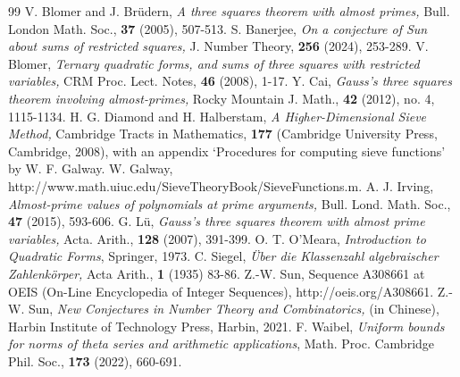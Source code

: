 \documentclass[10pt,a4paper]{amsart}
\numberwithin{equation}{section}
\begin{document}
\begin{thebibliography}{99}
 V. Blomer and J. Br\"udern, {\it A three squares theorem with almost primes,} Bull. London Math. Soc., {\bf37} (2005), 507-513.
 S. Banerjee, {\it On a conjecture of Sun about sums of restricted squares,} J. Number Theory, {\bf256} (2024), 253-289.
 V. Blomer, {\it Ternary quadratic forms, and sums of three squares with restricted variables,} CRM Proc. Lect. Notes, {\bf46} (2008), 1-17.
 Y. Cai, {\it Gauss's three squares theorem involving almost-primes,} Rocky Mountain J. Math., {\bf 42} (2012), no. 4, 1115-1134.
 H. G. Diamond and H. Halberstam, {\it A Higher-Dimensional Sieve Method,} Cambridge Tracts in Mathematics, {\bf177} (Cambridge University Press, Cambridge, 2008), with an appendix `Procedures for computing sieve functions' by W. F. Galway.
 W. Galway, http://www.math.uiuc.edu/SieveTheoryBook/SieveFunctions.m.
 A. J. Irving, {\it Almost-prime values of polynomials at prime arguments,} Bull. Lond. Math. Soc., {\bf47} (2015), 593-606.
 G. L\"u, {\it Gauss's three squares theorem with almost prime variables,} Acta. Arith., {\bf128} (2007), 391-399.
 O. T. O'Meara, {\it Introduction to Quadratic Forms}, Springer, 1973.
 C. Siegel, {\it \"Uber die Klassenzahl algebraischer Zahlenk\"orper,} Acta Arith., {\bf1} (1935) 83-86.
 Z.-W. Sun, Sequence A308661 at OEIS (On-Line Encyclopedia of Integer Sequences), http://oeis.org/A308661.
 Z.-W. Sun, {\it New Conjectures in Number Theory and Combinatorics,} (in Chinese), Harbin Institute of Technology Press, Harbin, 2021.
 F. Waibel, {\it Uniform bounds for norms of theta series and arithmetic applications}, Math. Proc. Cambridge Phil. Soc., {\bf173} (2022), 660-691.
\end{thebibliography}
\end{document}
